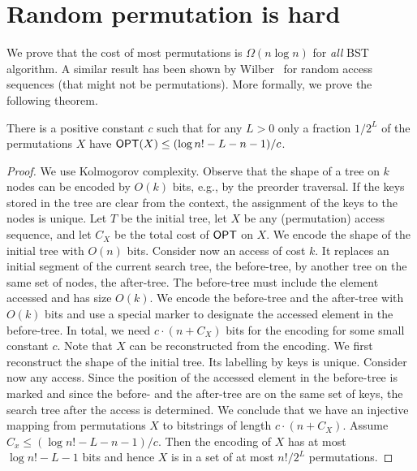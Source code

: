 \section{Random permutation is hard}
\label{sec:random-hard}

We prove that the cost of most permutations is $\Omega(n\log n)$ for \emph{all} BST algorithm. A similar result has been shown by Wilber~\cite{wilber} for random access sequences (that might not be permutations).
More formally, we prove the following theorem. 

\begin{theorem} 
\label{thm:random-perm-hard}
There is a positive constant $c$ such that for any $L > 0$ only a fraction $1/2^L$ of the permutations $X$ have
$\mbox{\sf OPT}(X) \le (\log n! - L -n -1)/c$. 
\end{theorem}   
\begin{proof}
We use Kolmogorov complexity. Observe that the shape of a tree on $k$ nodes can be encoded by $O(k)$ bits, e.g., by the preorder traversal. If the keys stored in the tree are clear from the context, the assignment of the keys to the nodes is unique. Let $T$ be the initial tree, let $X$ be any (permutation) access sequence, and let $C_X$ be the total cost of $\mbox{\sf OPT}$ on $X$. We encode the shape of the initial tree with $O(n)$ bits.  Consider now an access of cost $k$. It replaces an initial segment of the current search tree, the before-tree, by another tree on the same set of nodes, the after-tree. The before-tree must include the element accessed and has size $O(k)$. We encode the before-tree and the after-tree with $O(k)$ bits and use a special marker to designate the accessed element in the before-tree. In total, we need $c \cdot (n + C_X)$ bits for the encoding for some small constant $c$. Note that $X$ can be reconstructed from the encoding. We first reconstruct the shape of the initial tree. Its labelling by keys is unique. 
Consider now any access. Since the position of the accessed element in the before-tree is marked and since the before- and the after-tree are on the same set of keys, the search tree after the access is determined. We conclude that we have an injective mapping from permutations $X$ to bitstrings of length $c \cdot (n + C_X)$. 
Assume $C_x \le (\log n! - L - n - 1)/c$. Then the encoding of $X$ has at most $\log n! - L - 1$ bits and hence $X$ is in a set of at most $n!/2^L$ permutations.
\end{proof}


